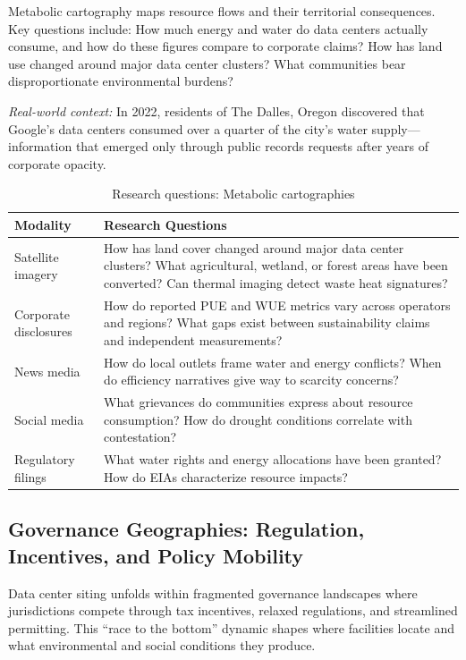 \documentclass[review]{elsarticle}
\begin{document}
Metabolic cartography maps resource flows and their territorial consequences. Key questions include: How much energy and water do data centers actually consume, and how do these figures compare to corporate claims? How has land use changed around major data center clusters? What communities bear disproportionate environmental burdens?

\textit{Real-world context:} In 2022, residents of The Dalles, Oregon discovered that Google's data centers consumed over a quarter of the city's water supply---information that emerged only through public records requests after years of corporate opacity.

\begin{table}[h]
\caption{Research questions: Metabolic cartographies}
\label{tab:metabolic}
\begin{tabular}{p{3cm}p{9cm}}
\toprule
\textbf{Modality} & \textbf{Research Questions} \\
\midrule
Satellite imagery & How has land cover changed around major data center clusters? What agricultural, wetland, or forest areas have been converted? Can thermal imaging detect waste heat signatures? \\
\addlinespace
Corporate disclosures & How do reported PUE and WUE metrics vary across operators and regions? What gaps exist between sustainability claims and independent measurements? \\
\addlinespace
News media & How do local outlets frame water and energy conflicts? When do efficiency narratives give way to scarcity concerns? \\
\addlinespace
Social media & What grievances do communities express about resource consumption? How do drought conditions correlate with contestation? \\
\addlinespace
Regulatory filings & What water rights and energy allocations have been granted? How do EIAs characterize resource impacts? \\
\bottomrule
\end{tabular}
\end{table}

\subsection{Governance Geographies: Regulation, Incentives, and Policy Mobility}

Data center siting unfolds within fragmented governance landscapes where jurisdictions compete through tax incentives, relaxed regulations, and streamlined permitting. This ``race to the bottom'' dynamic shapes where facilities locate and what environmental and social conditions they produce.
\end{document}
